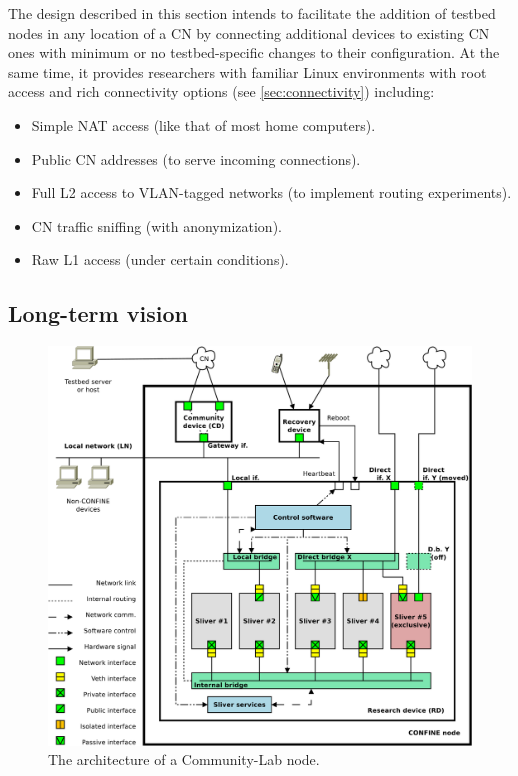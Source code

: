 \documentclass[conference]{IEEEtran}
\begin{document}
The design described in this section intends to facilitate the addition of
testbed nodes in any location of a CN by connecting additional devices to
existing CN ones with minimum or no testbed-specific changes to their
configuration.  At the same time, it provides researchers with familiar
Linux environments with root access and rich connectivity
options (see \ref{sec:connectivity}) including:

\begin{itemize}
\item Simple NAT access (like that of most home computers).
\item Public CN addresses (to serve incoming connections).
\item Full L2 access to VLAN-tagged networks (to implement routing
  experiments).
\item CN traffic sniffing (with anonymization).
\item Raw L1 access (under certain conditions).
\end{itemize}

\subsection{Long-term vision}

\begin{figure}[!t]
\centering
\includegraphics[width=\linewidth]{node-arch}
\caption{The architecture of a Community-Lab node.}
\label{fig:node-arch}
\end{figure}
\end{document}
